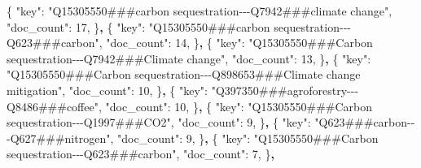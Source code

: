 \documentclass[
]{article}
\newenvironment{Shaded}{}{}
\newcommand{\DataTypeTok}[1]{\textcolor[rgb]{0.56,0.13,0.00}{#1}}
\newcommand{\DecValTok}[1]{\textcolor[rgb]{0.25,0.63,0.44}{#1}}
\newcommand{\ErrorTok}[1]{\textcolor[rgb]{1.00,0.00,0.00}{\textbf{#1}}}
\newcommand{\FunctionTok}[1]{\textcolor[rgb]{0.02,0.16,0.49}{#1}}
\newcommand{\StringTok}[1]{\textcolor[rgb]{0.25,0.44,0.63}{#1}}
\begin{document}
\begin{Shaded}
\begin{Highlighting}[]
                \FunctionTok{\{}
                    \DataTypeTok{"key"}\FunctionTok{:} \StringTok{"Q15305550\#\#\#carbon sequestration{-}{-}{-}Q7942\#\#\#climate change"}\FunctionTok{,}
                    \DataTypeTok{"doc\_count"}\FunctionTok{:} \DecValTok{17}\FunctionTok{,}
                \FunctionTok{\}}\ErrorTok{,}
                \FunctionTok{\{}
                    \DataTypeTok{"key"}\FunctionTok{:} \StringTok{"Q15305550\#\#\#carbon sequestration{-}{-}{-}Q623\#\#\#carbon"}\FunctionTok{,}
                    \DataTypeTok{"doc\_count"}\FunctionTok{:} \DecValTok{14}\FunctionTok{,}
                \FunctionTok{\}}\ErrorTok{,}
                \FunctionTok{\{}
                    \DataTypeTok{"key"}\FunctionTok{:} \StringTok{"Q15305550\#\#\#Carbon sequestration{-}{-}{-}Q7942\#\#\#Climate change"}\FunctionTok{,}
                    \DataTypeTok{"doc\_count"}\FunctionTok{:} \DecValTok{13}\FunctionTok{,}
                \FunctionTok{\}}\ErrorTok{,}
                \FunctionTok{\{}
                    \DataTypeTok{"key"}\FunctionTok{:} \StringTok{"Q15305550\#\#\#Carbon sequestration{-}{-}{-}Q898653\#\#\#Climate change mitigation"}\FunctionTok{,}
                    \DataTypeTok{"doc\_count"}\FunctionTok{:} \DecValTok{10}\FunctionTok{,}
                \FunctionTok{\}}\ErrorTok{,}
                \FunctionTok{\{}
                    \DataTypeTok{"key"}\FunctionTok{:} \StringTok{"Q397350\#\#\#agroforestry{-}{-}{-}Q8486\#\#\#coffee"}\FunctionTok{,}
                    \DataTypeTok{"doc\_count"}\FunctionTok{:} \DecValTok{10}\FunctionTok{,}
                \FunctionTok{\}}\ErrorTok{,}
                \FunctionTok{\{}
                    \DataTypeTok{"key"}\FunctionTok{:} \StringTok{"Q15305550\#\#\#Carbon sequestration{-}{-}{-}Q1997\#\#\#CO2"}\FunctionTok{,}
                    \DataTypeTok{"doc\_count"}\FunctionTok{:} \DecValTok{9}\FunctionTok{,}
                \FunctionTok{\}}\ErrorTok{,}
                \FunctionTok{\{}
                    \DataTypeTok{"key"}\FunctionTok{:} \StringTok{"Q623\#\#\#carbon{-}{-}{-}Q627\#\#\#nitrogen"}\FunctionTok{,}
                    \DataTypeTok{"doc\_count"}\FunctionTok{:} \DecValTok{9}\FunctionTok{,}
                \FunctionTok{\}}\ErrorTok{,}
                \FunctionTok{\{}
                    \DataTypeTok{"key"}\FunctionTok{:} \StringTok{"Q15305550\#\#\#Carbon sequestration{-}{-}{-}Q623\#\#\#carbon"}\FunctionTok{,}
                    \DataTypeTok{"doc\_count"}\FunctionTok{:} \DecValTok{7}\FunctionTok{,}
                \FunctionTok{\}}\ErrorTok{,}
\end{Highlighting}
\end{Shaded}
\end{document}
